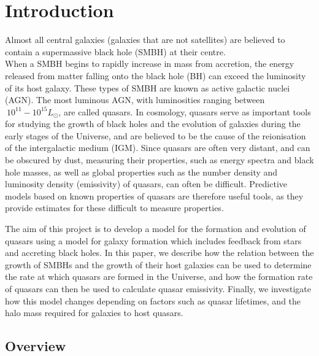 \documentclass[12pt]{article}%
\begin{document}
\newpage

\tableofcontents
\newpage
\twocolumngrid


\section{Introduction}

Almost all central galaxies (galaxies that are not satellites) are believed to contain a supermassive black hole (SMBH) at their centre.\\When a SMBH begins to rapidly increase in mass from accretion, the energy released from matter falling onto the black hole (BH) can exceed the luminosity of its host galaxy. These types of SMBH are known as active galactic nuclei (AGN). The most luminous AGN, with luminosities ranging between $~10^{11} - 10^{15}L_\odot$, are called quasars. In cosmology, quasars serve as important tools for studying the growth of black holes and the evolution of galaxies during the early stages of the Universe, and are believed to be the cause of the reionisation of the intergalactic medium (IGM). Since quasars are often very distant, and can be obscured by dust, measuring their properties, such as energy spectra and black hole masses, as well as global properties such as the number density and luminosity density (emissivity) of quasars, can often be difficult. Predictive models based on known properties of quasars are therefore useful tools, as they provide estimates for these difficult to measure properties.\par

The aim of this project is to develop a model for the formation and evolution of quasars using a model for galaxy formation which includes feedback from stars and accreting black holes. In this paper, we describe how the relation between the growth of SMBHs and the growth of their host galaxies can be used to determine the rate at which quasars are formed in the Universe, and how the formation rate of quasars can then be used to calculate quasar emissivity. Finally, we investigate how this model changes depending on factors such as quasar lifetimes, and the halo mass required for galaxies to host quasars.

\subsection{Overview}
\end{document}
